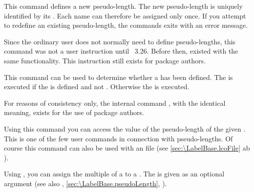 \begin{Declaration}
\end{Declaration}
This command
defines a new pseudo-length. The new pseudo-length is uniquely identified by
its . Each name can therefore be assigned only once. If you
attempt to redefine an existing pseudo-length, the commands exits with an
error message.

%
Since the ordinary user does not normally need to define pseudo-lengths, this
command was not a user instruction until \KOMAScript~3.26. Before then,
 existed with the same functionality. This instruction still
exists for package authors.%
\EndIndexGroup


\begin{Declaration}
\end{Declaration}
This command can be
used to determine whether a  has been defined. The
 is executed if the  is defined and not
. Otherwise the  is executed.

%
For reasons of consistency only, the internal command ,
with the identical meaning, exists for the use of package authors.%
\EndIndexGroup


\begin{Declaration}
\end{Declaration}
Using this command you can access the value of the pseudo-length of
the given . This is one of the few user commands in
connection with pseudo-lengths. Of course this command can also be
used with an  file (see
\autoref{sec:\LabelBase.lcoFile} ab ).%
%
\EndIndexGroup


\begin{Declaration}
\end{Declaration}
Using , you can assign the multiple of a
 to a . The  is given as an
optional argument (see also ,
\autoref{sec:\LabelBase.pseudoLength},
).

